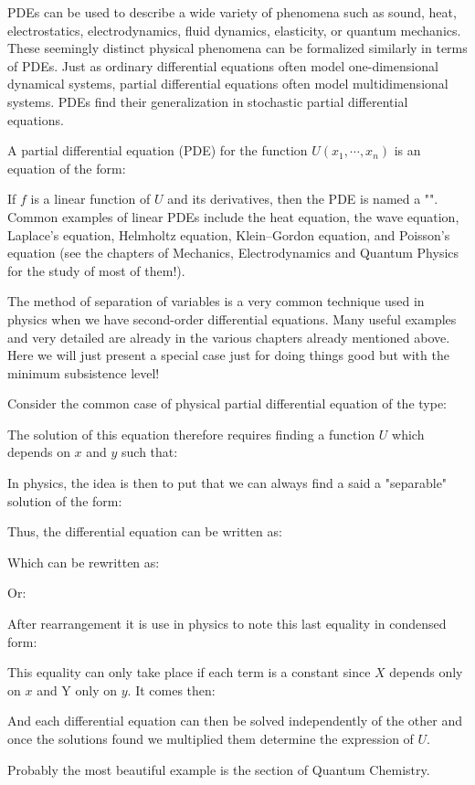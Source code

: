 	PDEs can be used to describe a wide variety of phenomena such as sound, heat, electrostatics, electrodynamics, fluid dynamics, elasticity, or quantum mechanics. These seemingly distinct physical phenomena can be formalized similarly in terms of PDEs. Just as ordinary differential equations often model one-dimensional dynamical systems, partial differential equations often model multidimensional systems. PDEs find their generalization in stochastic partial differential equations.
	
	A partial differential equation (PDE) for the function $U(x_{1},\cdots ,x_{n})$ is an equation of the form:
	
	If $f$ is a linear function of $U$ and its derivatives, then the PDE is named a "". Common examples of linear PDEs include the heat equation, the wave equation, Laplace's equation, Helmholtz equation, Klein–Gordon equation, and Poisson's equation (see the chapters of Mechanics, Electrodynamics and Quantum Physics for the study of most of them!).
	
	The method of separation of variables is a very common technique used in physics when we have second-order differential equations. Many useful examples and very detailed are already in the various chapters already mentioned above. Here we will just present a special case just for doing things good but with the minimum subsistence level!
	
	Consider the common case of physical partial differential equation of the type:
	
	The solution of this equation therefore requires finding a function $U$ which depends on $x$ and $y$ such that:
	
	In physics, the idea is then to put that we can always find a said a "separable" solution of the form:
	
	Thus, the differential equation can be written as:
	
	Which can be rewritten as:
	
	Or:
	
	After rearrangement it is use in physics to note this last equality in condensed form:
	
	This equality can only take place if each term is a constant since $X$ depends only on $x$ and Y only on $y$. It comes then:
	
	And each differential equation can then be solved independently of the other and once the solutions found we multiplied them determine the expression of $U$.
	\begin{tcolorbox}[title=Remark,colframe=black,arc=10pt]
	Probably the most beautiful example is the section of Quantum Chemistry.
	\end{tcolorbox}
	
